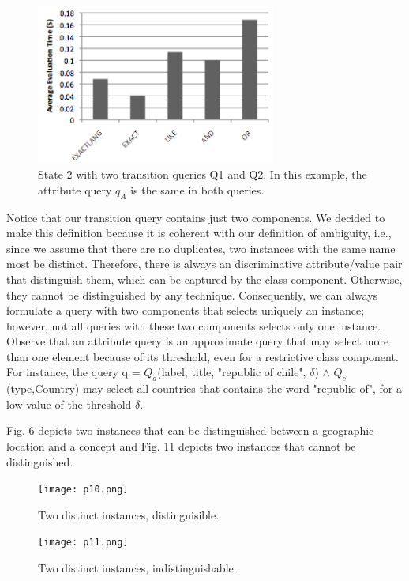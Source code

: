 \begin{figure} 
\centering
\includegraphics[width=0.7\textwidth]{p9.png}
\caption{State 2 with two transition queries Q1 and Q2. In this example, the attribute query $q_A$ is the same in both queries.} 
\end{figure} 

Notice that our transition query contains just two components. We decided to make this definition because it is coherent with our definition of ambiguity, i.e., since we assume that there are no duplicates, two instances with the same name most be distinct. Therefore, there is always an discriminative attribute/value pair that distinguish them, which can be captured by the class component. Otherwise, they cannot be distinguished by any technique. Consequently, we can always formulate a query with two components that selects uniquely an instance; however, not all queries with these two components selects only one instance. Observe that an attribute query is an approximate query that may select more than one element because of its threshold, even for a restrictive class component.  For instance, the query q = $Q_a$(label, title, "republic of chile", $\delta$) $\land$ $Q_c$(type,Country) may select all countries that contains the word "republic of", for a low value of the threshold $\delta$.

Fig. 6 depicts two instances that can be distinguished between a geographic location and a concept and Fig. 11 depicts two instances that cannot be distinguished. 

\begin{figure} 
\centering
\texttt{[image: p10.png]}
\caption{Two distinct instances, distinguisible.} 
\end{figure} 

\begin{figure} 
\centering
\texttt{[image: p11.png]}
\caption{Two distinct instances, indistinguishable.} 
\end{figure} 


